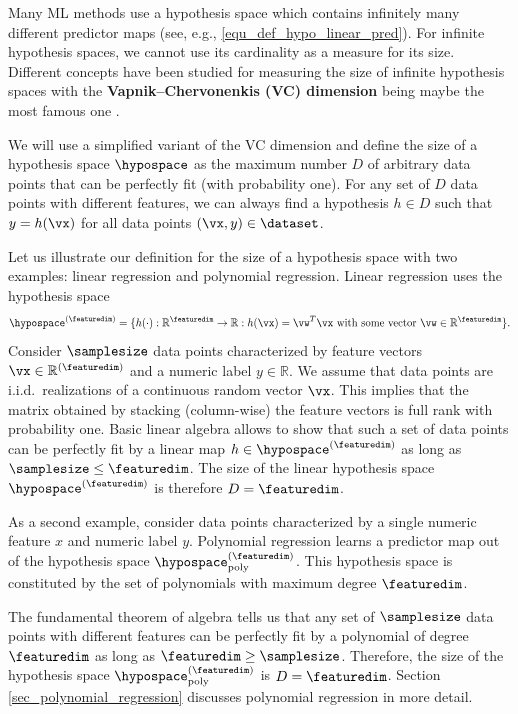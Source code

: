 \documentclass[12pt]{report}
\newcommand{\sizehypospace}{D}
\newcommand{\featurelen}{\featuredim}
\begin{document}
Many ML methods use a hypothesis space which contains 
infinitely many different predictor maps (see, e.g., \eqref{equ_def_hypo_linear_pred}). 
For infinite hypothesis spaces, we cannot use its 
cardinality as a measure for its size. Different concepts 
have been studied for measuring the size of infinite 
hypothesis spaces with the {\bf Vapnik–Chervonenkis (VC) dimension} 
being maybe the most famous one \cite{VapnikBook}. 

We will use a simplified variant of the VC dimension and define the 
size of a hypothesis space $\hypospace$ as the maximum number 
$\sizehypospace$ of arbitrary data points that can be perfectly fit 
(with probability one). For any set of $\sizehypospace$ data points 
with different features, we can always find a hypothesis $h \in \sizehypospace$ 
such that $y=h(\vx)$ for all data points $(\vx,y) \in \dataset$. 

Let us illustrate our definition for the size of a hypothesis space 
with two examples: linear regression and polynomial regression. 
Linear regression uses the hypothesis space 
$$\hypospace^{(\featuredim)} = \{ h(\cdot): \mathbb{R}^{\featuredim} \rightarrow \mathbb{R}: h(\vx) = \vw^{T} \vx \mbox{ with some vector } \vw \in \mathbb{R}^{\featurelen}\}.$$ 
Consider $\samplesize$ data points characterized by feature 
vectors $\vx \in \mathbb{R}^{(\featuredim)}$ and a numeric label 
$y \in \mathbb{R}$. We assume that data points are i.i.d.\ realizations 
of a continuous random vector $\vx$. This implies that the matrix 
obtained by stacking (column-wise) the feature vectors is full rank 
with probability one. Basic linear algebra allows to show that 
such a set of data points can be perfectly fit by a linear map $h \in \hypospace^{(\featuredim)}$ 
as long as $\samplesize \leq \featuredim$. The size of the linear 
hypothesis space $\hypospace^{(\featuredim)}$ is therefore $\sizehypospace = \featuredim$. 

As a second example, consider data points characterized 
by a single numeric feature $x$ and numeric label $y$. 
Polynomial regression learns a predictor map out of 
the hypothesis space $\hypospace_{\rm poly}^{(\featuredim)}$. 
This hypothesis space is constituted by the set of  
polynomials with maximum degree $\featuredim$. 

The fundamental theorem of algebra tells us that any set 
of $\samplesize$ data points with different features can 
be perfectly fit by a polynomial of degree $\featuredim$ 
as long as $\featuredim \geq \samplesize$. Therefore, the 
size of the hypothesis space $\hypospace_{\rm poly}^{(\featuredim)}$ 
is $\sizehypospace=\featuredim$. Section \ref{sec_polynomial_regression} 
discusses polynomial regression in more detail. 
\end{document}
